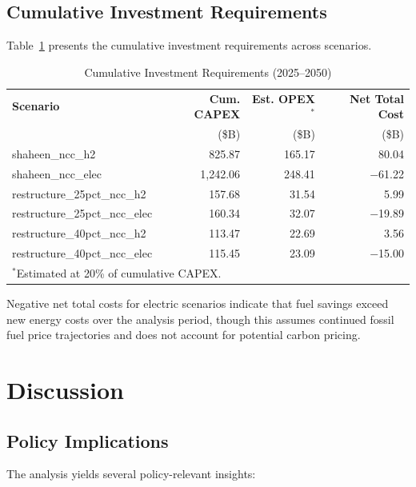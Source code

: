 \documentclass[12pt,a4paper]{article}
\begin{document}
\subsection{Cumulative Investment Requirements}

Table~\ref{tab:investment} presents the cumulative investment requirements across scenarios.

\begin{table}[H]
\centering
\caption{Cumulative Investment Requirements (2025--2050)}
\label{tab:investment}
\begin{tabular}{@{}lrrr@{}}
\toprule
\textbf{Scenario} & \textbf{Cum. CAPEX} & \textbf{Est. OPEX}$^*$ & \textbf{Net Total Cost} \\
 & (\$B) & (\$B) & (\$B) \\
\midrule
shaheen\_ncc\_h2 & 825.87 & 165.17 & 80.04 \\
shaheen\_ncc\_elec & 1,242.06 & 248.41 & $-$61.22 \\
restructure\_25pct\_ncc\_h2 & 157.68 & 31.54 & 5.99 \\
restructure\_25pct\_ncc\_elec & 160.34 & 32.07 & $-$19.89 \\
restructure\_40pct\_ncc\_h2 & 113.47 & 22.69 & 3.56 \\
restructure\_40pct\_ncc\_elec & 115.45 & 23.09 & $-$15.00 \\
\bottomrule
\multicolumn{4}{l}{\footnotesize $^*$Estimated at 20\% of cumulative CAPEX.}
\end{tabular}
\end{table}

Negative net total costs for electric scenarios indicate that fuel savings exceed new energy costs over the analysis period, though this assumes continued fossil fuel price trajectories and does not account for potential carbon pricing.

\section{Discussion}

\subsection{Policy Implications}

The analysis yields several policy-relevant insights:
\end{document}

